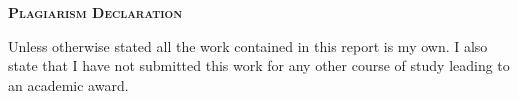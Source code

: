 \documentclass{article}
\begin{document}
\onehalfspacing
\hypersetup{pageanchor=false}

\hypersetup{pageanchor=true}
\clearpage
\begin{center}
\begin{minipage}{\textwidth}
  
{\scshape\large \textbf{Plagiarism Declaration}\par}
\vspace{1cm}
Unless otherwise stated all the work contained in this report is my own.  I also state that I have not submitted this work for any other course of study leading to an academic award.
\end{minipage}
\end{center}
\vfill %
\clearpage

\tableofcontents

\newpage
\printglossaries

\newpage


\newpage


\newpage


\newpage


\newpage


\clearpage

\end{document}
